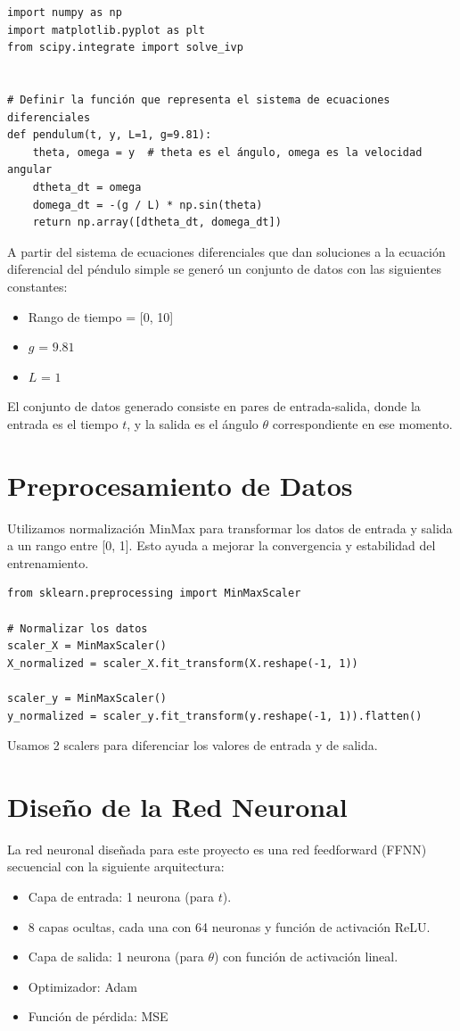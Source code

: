\documentclass[a4paper,12pt]{article}
\begin{document}
\begin{verbatim}
import numpy as np
import matplotlib.pyplot as plt
from scipy.integrate import solve_ivp


# Definir la función que representa el sistema de ecuaciones diferenciales
def pendulum(t, y, L=1, g=9.81):
    theta, omega = y  # theta es el ángulo, omega es la velocidad angular
    dtheta_dt = omega
    domega_dt = -(g / L) * np.sin(theta)
    return np.array([dtheta_dt, domega_dt])
\end{verbatim}

A partir del sistema de ecuaciones diferenciales que dan soluciones a la ecuación diferencial del péndulo simple se generó un conjunto de datos con las siguientes constantes:
\begin{itemize}
    \item Rango de tiempo = [0, 10]
    \item \(g\) = \(9.81\)
    \item \(L\) = \(1\)
\end{itemize}

El conjunto de datos generado consiste en pares de entrada-salida, donde la entrada es el tiempo \(t\), y la salida es el ángulo \(\theta\) correspondiente en ese momento.

\section{Preprocesamiento de Datos}
Utilizamos normalización MinMax para transformar los datos de entrada y salida a un rango entre [0, 1]. Esto ayuda a mejorar la convergencia y estabilidad del entrenamiento.

\begin{verbatim}
from sklearn.preprocessing import MinMaxScaler

# Normalizar los datos
scaler_X = MinMaxScaler()
X_normalized = scaler_X.fit_transform(X.reshape(-1, 1))

scaler_y = MinMaxScaler()
y_normalized = scaler_y.fit_transform(y.reshape(-1, 1)).flatten()
\end{verbatim}

Usamos 2 scalers para diferenciar los valores de entrada y de salida.

\section{Diseño de la Red Neuronal}
La red neuronal diseñada para este proyecto es una red feedforward (FFNN) secuencial con la siguiente arquitectura:
\begin{itemize}
    \item Capa de entrada: 1 neurona (para \(t\)).
    \item 8 capas ocultas, cada una con 64 neuronas y función de activación ReLU.
    \item Capa de salida: 1 neurona (para \(\theta\)) con función de activación lineal.
    \item Optimizador: Adam
    \item Función de pérdida: MSE
\end{itemize}
\end{document}

